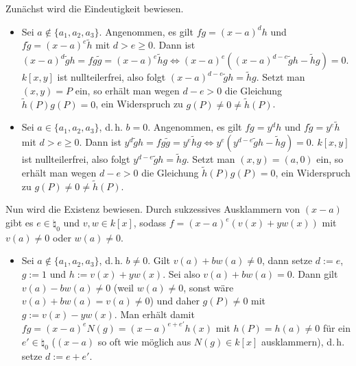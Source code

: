 \begin{Beweis}
    Zunächst wird die Eindeutigkeit bewiesen.
    \begin{itemize}
        \item
        Sei $a \notin \{a_1, a_2, a_3\}$.
        Angenommen, es gilt $fg = (x - a)^d h$ und $f\widetilde{g} = (x - a)^e \widetilde{h}$
        mit $d > e \ge 0$.
        Dann ist $(x - a)^d \widetilde{g} h = fg\widetilde{g} = (x - a)^e \widetilde{h} g \iff
        (x - a)^e ((x - a)^{d-e} \widetilde{g} h - \widetilde{h} g) = 0$.
        $k[x, y]$ ist nullteilerfrei, also folgt
        $(x - a)^{d-e} \widetilde{g} h = \widetilde{h} g$.
        Setzt man $(x, y) = P$ ein, so erhält man wegen $d - e > 0$ die Gleichung
        $\widetilde{h}(P) g(P) = 0$, ein Widerspruch zu
        $g(P) \not= 0 \not= \widetilde{h}(P)$.

        \item
        Sei $a \in \{a_1, a_2, a_3\}$, d.\,h. $b = 0$.
        Angenommen, es gilt $fg = y^d h$ und $f\widetilde{g} = y^e \widetilde{h}$
        mit $d > e \ge 0$.
        Dann ist $y^d \widetilde{g} h = fg\widetilde{g} = y^e \widetilde{h} g \iff
        y^e (y^{d-e} \widetilde{g} h - \widetilde{h} g) = 0$.
        $k[x, y]$ ist nullteilerfrei, also folgt
        $y^{d-e} \widetilde{g} h = \widetilde{h} g$.
        Setzt man $(x, y) = (a, 0)$ ein, so erhält man wegen $d - e > 0$ die Gleichung
        $\widetilde{h}(P) g(P) = 0$, ein Widerspruch zu
        $g(P) \not= 0 \not= \widetilde{h}(P)$.
    \end{itemize}

    Nun wird die Existenz bewiesen.
    Durch sukzessives Ausklammern von $(x - a)$
    gibt es $e \in \natural_0$ und $v, w \in k[x]$, sodass
    $f = (x - a)^e (v(x) + y w(x))$ mit $v(a) \not= 0$ oder $w(a) \not= 0$.
    \begin{itemize}
        \item
        Sei $a \notin \{a_1, a_2, a_3\}$, d.\,h. $b \not= 0$.
        Gilt $v(a) + bw(a) \not= 0$, dann setze $d := e$, $g := 1$ und $h := v(x) + yw(x)$.
        Sei also $v(a) + bw(a) = 0$.
        Dann gilt $v(a) - bw(a) \not= 0$
        (weil $w(a) \not= 0$, sonst wäre $v(a) + bw(a) = v(a) \not= 0$) und
        daher $g(P) \not= 0$ mit $g := v(x) - yw(x)$.
        Man erhält damit
        $fg = (x - a)^e N(g) = (x - a)^{e+e'} h(x)$ mit $h(P) = h(a) \not= 0$ für ein
        $e' \in \natural_0$
        ($(x - a)$ so oft wie möglich aus $N(g) \in k[x]$ ausklammern),
        d.\,h. setze $d := e + e'$.


\end{itemize}
\end{Beweis}
